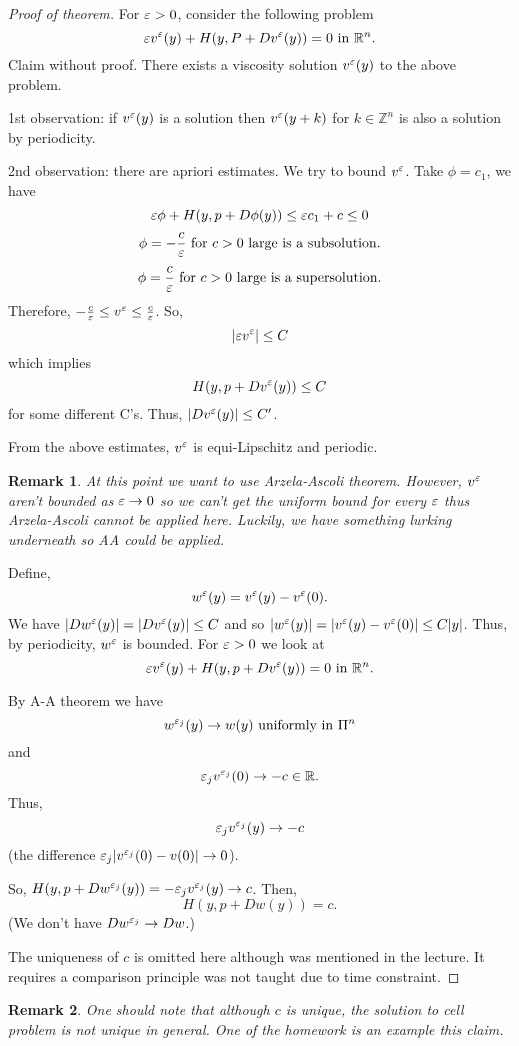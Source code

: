 \documentclass[11pt, oneside]{amsart}   	%
\newtheorem{remark}{Remark}
\newcommand\Z{\mathbb{Z}} \newcommand\N{\mathbb{N}} \newcommand\C{\mathbb{C}}
\begin{document}
\begin{proof}[Proof of theorem]
	For $\varepsilon>0$, consider the following problem
	$$\varepsilon v^\varepsilon(y) + H(y, P+Dv^\varepsilon(y))=0 \text{ in } \mathbb{R}^n.$$
	Claim without proof. There exists a viscosity solution $v^\varepsilon(y)$ to the above problem.
	
	1st observation: if $v^\varepsilon(y)$ is a solution then $v^\varepsilon(y+k)$ for $k\in \Z^n$ is also a solution by periodicity.
	
	2nd observation: there are apriori estimates. We try to bound $v^\varepsilon$. Take $\phi=c_1$, we have
	$$\varepsilon\phi + H(y, p+ D\phi(y))\le \varepsilon c_1 + c \le 0$$
	$$\phi = -\frac{c}{\varepsilon} \text{ for $c>0$ large is a subsolution}.$$
	$$\phi = \frac{c}{\varepsilon} \text{ for $c>0$ large is a supersolution}.$$
	Therefore, $-\frac{c}{\varepsilon} \le v^\varepsilon \le \frac{c}{\varepsilon}$. So,
	$$|\varepsilon v^\varepsilon|\le C$$ which implies $$H(y, p + Dv^\varepsilon(y))\le C$$ for some different C's. Thus, $|Dv^\varepsilon(y)|\le C'$.
	
	From the above estimates, $v^\varepsilon$ is equi-Lipschitz and periodic.
	\begin{remark}
		At this point we want to use Arzela-Ascoli theorem. However, $v^\varepsilon$ aren't bounded as $\varepsilon\to0$ so we can't get the uniform bound for every $\varepsilon$ thus Arzela-Ascoli cannot be applied here. Luckily, we have something lurking underneath so AA could be applied. 
	\end{remark}
	Define,
		$$w^\varepsilon(y)=v^\varepsilon(y)-v^\varepsilon(0).$$
		We have $|Dw^\varepsilon(y)| = |Dv^\varepsilon(y)| \le C$ and so $|w^\varepsilon(y)|= |v^\varepsilon(y)-v^\varepsilon(0)|\le C|y|$. Thus, by periodicity, $w^\varepsilon$ is bounded. For $\varepsilon >0$ we look at
		$$\varepsilon v^\varepsilon(y) + H(y, p+Dv^\varepsilon(y))=0 \text{ in $\mathbb{R}^n$}.$$
		
		By A-A theorem we have
		$$w^{\varepsilon_j}(y) \to w(y) \text{ uniformly in $\Pi^n$}$$
		and $$ \varepsilon_j v^{\varepsilon_j}(0)\to -c \in \mathbb{R}.$$
		Thus,
		$$\varepsilon_j v^{\varepsilon_j}(y)\to -c$$ (the difference $\varepsilon_j|v^{\varepsilon_j}(0)-v(0)|\to 0$).
		
		So, $H(y, p+Dw^{\varepsilon_j}(y))=-\varepsilon_j v^{\varepsilon_j}(y) \to c$. Then,
		$$H(y, p+ Dw(y))=c.$$ (We don't have $Dw^{\varepsilon_j}\to Dw$.)
		
		The uniqueness of $c$ is omitted here although was mentioned in the lecture. It requires a comparison principle was not taught due to time constraint.
\end{proof}
\begin{remark}
	One should note that although $c$ is unique, the solution to cell problem is not unique in general. One of the homework is an example this claim.
\end{remark}
\end{document}
